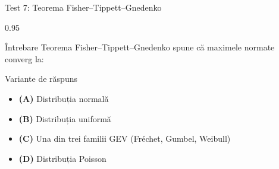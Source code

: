 \documentclass[9pt, aspectratio=169, t]{beamer}
\begin{document}
\begin{frame}{Test 7: Teorema Fisher--Tippett--Gnedenko}
    \begin{cminipage}{0.95\textwidth}
    \begin{alertblock}{Întrebare}
        Teorema Fisher--Tippett--Gnedenko spune că maximele normate converg la:
    \end{alertblock}
    \begin{block}{Variante de răspuns}
    \begin{itemize}\setlength{\itemsep}{0pt}
        \item \textcolor{MainBlue}{\textbf{(A)}} Distribuția normală
        \item \textcolor{MainBlue}{\textbf{(B)}} Distribuția uniformă
        \item \textcolor{MainBlue}{\textbf{(C)}} Una din trei familii GEV (Fréchet, Gumbel, Weibull)
        \item \textcolor{MainBlue}{\textbf{(D)}} Distribuția Poisson
    \end{itemize}
    \end{block}
    \end{cminipage}
\end{frame}
\end{document}
